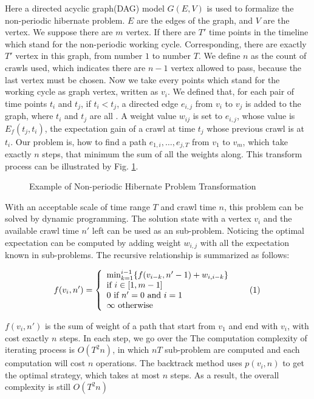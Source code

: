 \documentclass[conference]{IEEEtran}
\newcommand\numberthis{\addtocounter{equation}{1}\tag{\theequation}}
\begin{document}
Here a directed acyclic graph(DAG) model $G(E,V)$ is used to formalize the non-periodic hibernate problem.
$E$ are the edges of the graph, and $V$ are the vertex. We suppose there are $m$ vertex. 
If there are $T'$ time points in the timeline which stand for the non-periodic working cycle. Corresponding, there are exactly $T'$ vertex in this graph, from number $1$ to number $T$. 
We define $n$ as the count of crawls used, which indicates there are $n-1$ vertex allowed to pass, because the last vertex must be chosen. 
Now we take every points which stand for the working cycle as graph vertex, written as $v_i$. We defined that, for each pair of time points $t_i$ and $t_j$, if $t_i<t_j$, a directed edge $e_{i,j}$ from $v_i$ to $v_j$ is added to the graph, where $t_i$ and $t_j$ are all . A weight value $w_{ij}$ is set to $e_{i,j}$, whose value is $E_f(t_j, t_i)$, the expectation gain of a crawl at time $t_j$ whose previous crawl is at $t_i$.
Our problem is, how to find a path $e_{1,i},\ldots,e_{j,T}$ from $v_1$ to $v_m$, which take exactly $n$ steps, that minimum the sum of all the weights along. This transform process can be illustrated by Fig. \ref{fig:problemtrans}.

\begin{figure}
\centering

\captionsetup{justification=centering}
\caption{Example of Non-periodic Hibernate Problem Transformation}
\label{fig:problemtrans}
\end{figure}


With an acceptable scale of time range $T$ and crawl time $n$, this problem can be solved by dynamic programming. The solution state with a vertex $v_i$ and the available crawl time $n'$ left can be used as an sub-problem. Noticing the optimal expectation can be computed by adding weight $w_{i,j}$ with all the expectation known in sub-problems. The recursive relationship is summarized as follows:

\[f(v_i, n')=\left\{
    \begin{array}{lr}
	\min_{k=1}^{i-1}\{f(v_{i-k}, n'-1)+w_{i,i-k}\}\\
    \text{if }i\in[1, m-1]\\
    0\text{ if }n'=0\text{ and }i=1\\
    \infty\text{ otherwise}
    \end{array}\numberthis \label{dp}
    \right.
\]


$f(v_i,n')$ is the sum of weight of a path that start from $v_1$ and end with $v_i$, with cost exactly $n$ steps. In each step, we go over the  The computation complexity of iterating process is $O(T^2n)$, in which $nT$ sub-problem are computed and each computation will cost $n$ operations. The backtrack method uses $p(v_i, n)$ to get the optimal strategy, which takes at most $n$ steps. As a result, the overall complexity is still $O(T^2n)$ 
\end{document}
